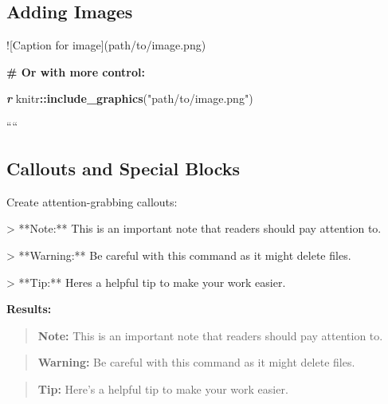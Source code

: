 \documentclass[
]{book}
\newenvironment{Shaded}{\begin{snugshade}}{\end{snugshade}}
\newcommand{\AlertTok}[1]{\textcolor[rgb]{0.94,0.16,0.16}{#1}}
\newcommand{\AttributeTok}[1]{\textcolor[rgb]{0.13,0.29,0.53}{#1}}
\newcommand{\FunctionTok}[1]{\textcolor[rgb]{0.13,0.29,0.53}{\textbf{#1}}}
\newcommand{\InformationTok}[1]{\textcolor[rgb]{0.56,0.35,0.01}{\textbf{\textit{#1}}}}
\newcommand{\NormalTok}[1]{#1}
\newcommand{\SpecialCharTok}[1]{\textcolor[rgb]{0.81,0.36,0.00}{\textbf{#1}}}
\newcommand{\StringTok}[1]{\textcolor[rgb]{0.31,0.60,0.02}{#1}}
\begin{document}
\subsection{Adding Images}\label{adding-images}

\begin{Shaded}
\begin{Highlighting}[]
\AlertTok{![Caption for image](path/to/image.png)}

\FunctionTok{\# Or with more control:}

\InformationTok{\textasciigrave{}\textasciigrave{}\textasciigrave{} r}
\NormalTok{knitr}\SpecialCharTok{::}\FunctionTok{include\_graphics}\NormalTok{(}\StringTok{"path/to/image.png"}\NormalTok{)}
\end{Highlighting}
\end{Shaded}

````

\subsection{Callouts and Special Blocks}\label{callouts-and-special-blocks}

Create attention-grabbing callouts:

\begin{Shaded}
\begin{Highlighting}[]
\AttributeTok{\textgreater{} **Note:** This is an important note that readers should pay attention to.}

\AttributeTok{\textgreater{} **Warning:** Be careful with this command as it might delete files.}

\AttributeTok{\textgreater{} **Tip:** Here\textquotesingle{}s a helpful tip to make your work easier.}
\end{Highlighting}
\end{Shaded}

\textbf{Results:}

\begin{quote}
\textbf{Note:} This is an important note that readers should pay attention to.
\end{quote}

\begin{quote}
\textbf{Warning:} Be careful with this command as it might delete files.
\end{quote}

\begin{quote}
\textbf{Tip:} Here's a helpful tip to make your work easier.
\end{quote}
\end{document}
